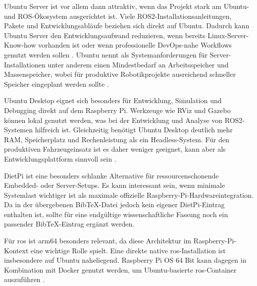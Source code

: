 Ubuntu Server ist vor allem dann attraktiv, wenn das Projekt stark am Ubuntu- und ROS-Ökosystem ausgerichtet ist. Viele ROS2-Installationsanleitungen, Pakete und Entwicklungsabläufe beziehen sich direkt auf Ubuntu. Dadurch kann Ubuntu Server den Entwicklungsaufwand reduzieren, wenn bereits Linux-Server-Know-how vorhanden ist oder wenn professionelle DevOps-nahe Workflows genutzt werden sollen \cite[Abschnitt ``Ubuntu'']{zotero-item-148}. Ubuntu nennt als Systemanforderungen für Server-Installationen unter anderem einen Mindestbedarf an Arbeitsspeicher und Massenspeicher, wobei für produktive Robotikprojekte ausreichend schneller Speicher eingeplant werden sollte \cite{zotero-item-153}.

Ubuntu Desktop eignet sich besonders für Entwicklung, Simulation und Debugging direkt auf dem Raspberry Pi. Werkzeuge wie RViz und Gazebo können lokal genutzt werden, was bei der Entwicklung und Analyse von ROS2-Systemen hilfreich ist. Gleichzeitig benötigt Ubuntu Desktop deutlich mehr RAM, Speicherplatz und Rechenleistung als ein Headless-System. Für den produktiven Fahrzeugeinsatz ist es daher weniger geeignet, kann aber als Entwicklungsplattform sinnvoll sein \cite{zotero-item-154}.

DietPi ist eine besonders schlanke Alternative für ressourcenschonende Embedded- oder Server-Setups. Es kann interessant sein, wenn minimale Systemlast wichtiger ist als maximale offizielle Raspberry-Pi-Hardwareintegration. Da in der übergebenen BibTeX-Datei jedoch kein eigener DietPi-Eintrag enthalten ist, sollte für eine endgültige wissenschaftliche Fassung noch ein passender BibTeX-Eintrag ergänzt werden.

Für \gls{ros} ist \gls{arm64} besonders relevant, da diese Architektur im Raspberry-Pi-Kontext eine wichtige Rolle spielt. Eine direkte native \gls{ros}-Installation ist insbesondere auf Ubuntu naheliegend. Raspberry Pi OS 64 Bit kann dagegen in Kombination mit Docker genutzt werden, um Ubuntu-basierte \gls{ros}-Container auszuführen \cite{zotero-item-156}.

